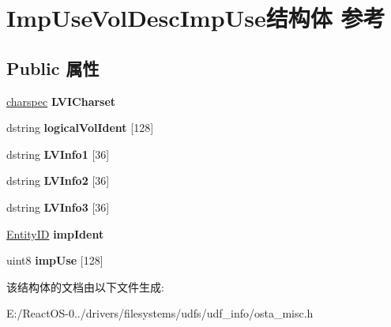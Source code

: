 \hypertarget{struct_imp_use_vol_desc_imp_use}{}\section{Imp\+Use\+Vol\+Desc\+Imp\+Use结构体 参考}
\label{struct_imp_use_vol_desc_imp_use}
\subsection*{Public 属性}
\begin{DoxyCompactItemize}
\item 
\mbox{\label{struct_imp_use_vol_desc_imp_use_ac289bce7b3bf2b809ef1d4944ad60d3b}} 
\hyperlink{structcharspec}{charspec} {\bfseries L\+V\+I\+Charset}
\item 
\mbox{\label{struct_imp_use_vol_desc_imp_use_ab72f401b25deb19d1cae4dc7280ef5a3}} 
dstring {\bfseries logical\+Vol\+Ident} \mbox{[}128\mbox{]}
\item 
\mbox{\label{struct_imp_use_vol_desc_imp_use_a4722cb09259cc5b8fdfc50f5addbf454}} 
dstring {\bfseries L\+V\+Info1} \mbox{[}36\mbox{]}
\item 
\mbox{\label{struct_imp_use_vol_desc_imp_use_a593347f16c40a4510850b197f0ae92f3}} 
dstring {\bfseries L\+V\+Info2} \mbox{[}36\mbox{]}
\item 
\mbox{\label{struct_imp_use_vol_desc_imp_use_adee459f5594606dfe05011e7d5ee3530}} 
dstring {\bfseries L\+V\+Info3} \mbox{[}36\mbox{]}
\item 
\mbox{\label{struct_imp_use_vol_desc_imp_use_a431970c4f2fb90cf73fc4b0e7c20351e}} 
\hyperlink{struct_entity_i_d}{Entity\+ID} {\bfseries imp\+Ident}
\item 
\mbox{\label{struct_imp_use_vol_desc_imp_use_a6d7725c45c38104dd9636dd73f805d79}} 
uint8 {\bfseries imp\+Use} \mbox{[}128\mbox{]}
\end{DoxyCompactItemize}


该结构体的文档由以下文件生成\+:\begin{DoxyCompactItemize}
\item 
E\+:/\+React\+O\+S-\/0../drivers/filesystems/udfs/udf\+\_\+info/osta\+\_\+misc.\+h\end{DoxyCompactItemize}

